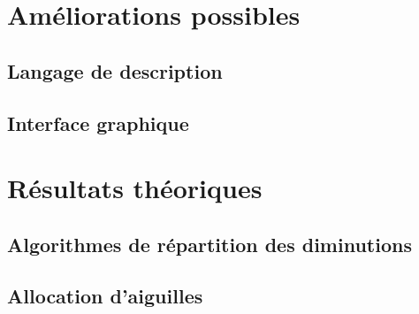 \documentclass{article}
\begin{document}




\section{Améliorations possibles}


\subsection{Langage de description}

\subsection{Interface graphique}




\section{Résultats théoriques}

\subsection{Algorithmes de répartition des diminutions}

\subsection{Allocation d'aiguilles}
\end{document}
